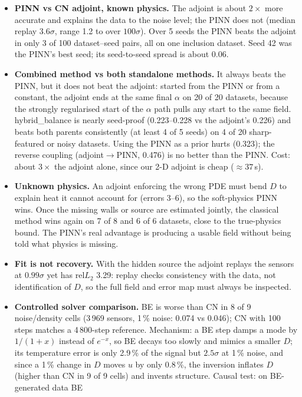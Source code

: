 \documentclass[10pt,a4paper]{article}
\begin{document}
\begin{itemize}
\item \textbf{PINN vs CN adjoint, known physics.} The adjoint is about $2\times$ more accurate and explains the data
to the noise level; the PINN does not (median replay $3.6\sigma$, range 1.2 to over $100\sigma$). Over 5 seeds the
PINN beats the adjoint in only 3 of 100 dataset--seed pairs, all on one inclusion dataset. Seed 42 was the PINN's best
seed; its seed-to-seed spread is about 0.06.
\item \textbf{Combined method vs both standalone methods.} It always beats the PINN, but it does not beat the
adjoint: started from the PINN or from a constant, the adjoint ends at the same final $\alpha$ on 20 of 20 datasets,
because the strongly regularised start of the $\alpha$ path pulls any start to the same field. hybrid\_balance is
nearly seed-proof (0.223--0.228 vs the adjoint's 0.226) and beats both parents consistently (at least 4 of 5 seeds)
on 4 of 20 sharp-featured or noisy datasets. Using the PINN as a prior hurts (0.323); the reverse coupling
(adjoint$\to$PINN, 0.476) is no better than the PINN. Cost: about $3\times$ the adjoint alone, since our 2-D adjoint is cheap ($\approx37$\,s).
\item \textbf{Unknown physics.} An adjoint enforcing the wrong PDE must bend $D$ to explain heat it cannot account for
(errors 3--6), so the soft-physics PINN wins. Once the missing walls or source are estimated jointly, the classical
method wins again on 7 of 8 and 6 of 6 datasets, close to the true-physics bound. The PINN's real advantage is
producing a usable field without being told what physics is missing.
\item \textbf{Fit is not recovery.} With the hidden source the adjoint replays the sensors at $0.99\sigma$ yet has
rel$L_2$ 3.29: replay checks consistency with the data, not identification of $D$, so the full field and error map
must always be inspected.
\item \textbf{Controlled solver comparison.} BE is worse than CN in 8 of 9 noise/density cells (3\,969 sensors, 1\,\%
noise: 0.074 vs 0.046); CN with 100 steps matches a 4\,800-step reference. Mechanism: a BE step damps a mode by
$1/(1+x)$ instead of $e^{-x}$, so BE decays too slowly and mimics a smaller $D$; its temperature error is only
2.9\,\% of the signal but $2.5\sigma$ at 1\,\% noise, and since a 1\,\% change in $D$ moves $u$ by only 0.8\,\%, the
inversion inflates $D$ (higher than CN in 9 of 9 cells) and invents structure. Causal test: on BE-generated data BE

\end{itemize}
\end{document}
